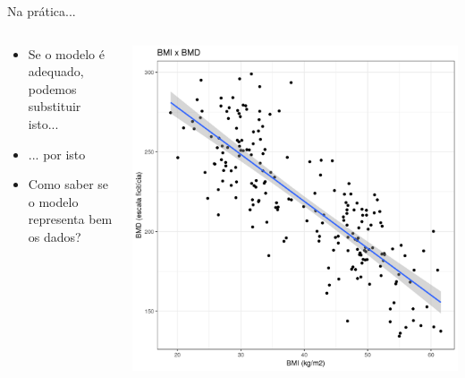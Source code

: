 \documentclass{beamer}
\begin{document}
\begin{frame}{\scriptsize Na prática...}
  \begin{columns}
    \begin{column}{5cm}
      \begin{itemize}
        \small
      \item \alert{Se o modelo é adequado}, podemos substituir isto...
        \bigskip
      \item<0> ... por isto
        \bigskip
      \item<0> Como saber se o modelo representa bem os dados?
      \end{itemize}
    \end{column}
    \begin{column}{5cm}
      \begin{center}
        \includegraphics[width=1.1\textwidth]{Cap18-19/pratica-rls2}
      \end{center}
    \end{column}
  \end{columns}
\end{frame}
\end{document}

